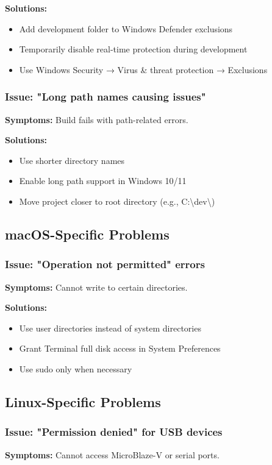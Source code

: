 \documentclass[11pt,a4paper]{article}
\begin{document}
\textbf{Solutions:}
\begin{itemize}
    \item Add development folder to Windows Defender exclusions
    \item Temporarily disable real-time protection during development
    \item Use Windows Security → Virus \& threat protection → Exclusions
\end{itemize}

\subsubsection{Issue: "Long path names causing issues"}
\textbf{Symptoms:} Build fails with path-related errors.

\textbf{Solutions:}
\begin{itemize}
    \item Use shorter directory names
    \item Enable long path support in Windows 10/11
    \item Move project closer to root directory (e.g., C:\textbackslash dev\textbackslash)
\end{itemize}

\subsection{macOS-Specific Problems}

\subsubsection{Issue: "Operation not permitted" errors}
\textbf{Symptoms:} Cannot write to certain directories.

\textbf{Solutions:}
\begin{itemize}
    \item Use user directories instead of system directories
    \item Grant Terminal full disk access in System Preferences
    \item Use sudo only when necessary
\end{itemize}

\subsection{Linux-Specific Problems}

\subsubsection{Issue: "Permission denied" for USB devices}
\textbf{Symptoms:} Cannot access MicroBlaze-V or serial ports.
\end{document}
